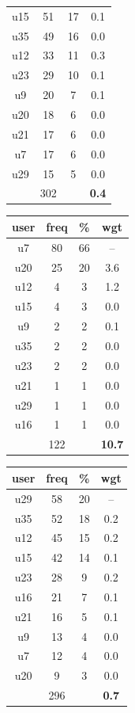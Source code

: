 \begin{table}
\begin{tabular}{ |c|c|c|c| }
	u15 & 51 & 17 & 0.1 \\
	u35 & 49 & 16 & 0.0 \\
	u12 & 33 & 11 & 0.3 \\
	u23 & 29 & 10 & 0.1 \\
	u9 & 20 & 7 & 0.1 \\
	u20 & 18 & 6 & 0.0 \\
	u21 & 17 & 6 & 0.0 \\
	u7 & 17 & 6 & 0.0 \\
	u29 & 15 & 5 & 0.0 \\
	 & 302 & & \textbf{0.4} \\
	\hline
\end{tabular}
\begin{tabular}{ |c|c|c|c| }
	\hline
	\textbf{user} & \textbf{freq} & \textbf{\%} & \textbf{wgt} \\
	\hline
	u7 & 80 & 66 & -- \\
	u20 & 25 & 20 & 3.6 \\
	u12 & 4 & 3 & 1.2 \\
	u15 & 4 & 3 & 0.0 \\
	u9 & 2 & 2 & 0.1 \\
	u35 & 2 & 2 & 0.0 \\
	u23 & 2 & 2 & 0.0 \\
	u21 & 1 & 1 & 0.0 \\
	u29 & 1 & 1 & 0.0 \\
	u16 & 1 & 1 & 0.0 \\
	 & 122 & & \textbf{10.7} \\
	\hline
\end{tabular}
\begin{tabular}{ |c|c|c|c| }
	\hline
	\textbf{user} & \textbf{freq} & \textbf{\%} & \textbf{wgt} \\
	\hline
	u29 & 58 & 20 & -- \\
	u35 & 52 & 18 & 0.2 \\
	u12 & 45 & 15 & 0.2 \\
	u15 & 42 & 14 & 0.1 \\
	u23 & 28 & 9 & 0.2 \\
	u16 & 21 & 7 & 0.1 \\
	u21 & 16 & 5 & 0.1 \\
	u9 & 13 & 4 & 0.0 \\
	u7 & 12 & 4 & 0.0 \\
	u20 & 9 & 3 & 0.0 \\
	 & 296 & & \textbf{0.7} \\

\end{tabular}
\end{table}

